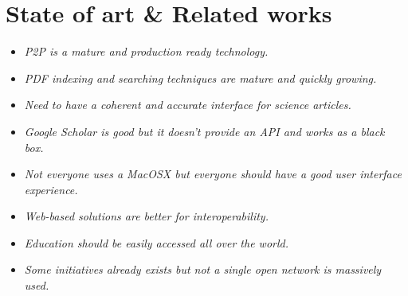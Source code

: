 \section{State of art \& Related works}

\begin{itemize}

\item \textit{P2P is a mature and production ready technology.}

\item \textit{PDF indexing and searching techniques are mature and quickly growing.}

\item \textit{Need to have a coherent and accurate interface for science articles.}

\end{itemize}

\begin{itemize}

\item \textit{Google Scholar is good but it doesn't provide an API and works as a black box.}

\item \textit{Not everyone uses a MacOSX but everyone should have a good user interface experience.}

\item \textit{Web-based solutions are better for interoperability.}

\item \textit{Education should be easily accessed all over the world.}

\item \textit{Some initiatives already exists but not a single open network is massively used.}

\end{itemize}

